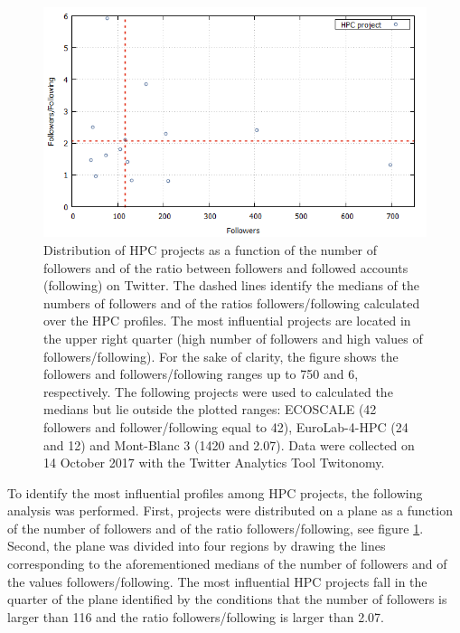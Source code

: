 \begin{figure}[!t] 
 \begin{center}
 \includegraphics[scale=0.45]{Images/HPC_influence.png}
 \caption{Distribution of HPC projects as a function of the number of followers and of the ratio between followers and followed accounts (following) on Twitter. The dashed lines identify the medians of the numbers of followers and of the ratios followers/following calculated over the HPC profiles. The most influential projects are located in the upper right quarter (high number of followers and high values of followers/following). For the sake of clarity, the figure shows the followers and followers/following ranges up to 750 and 6, respectively. The following projects were used to calculated the medians but lie outside the plotted ranges: ECOSCALE (42 followers and follower/following equal to 42), EuroLab-4-HPC (24 and 12) and Mont-Blanc 3 (1420 and 2.07). Data were collected on 14 October 2017 with the Twitter Analytics Tool Twitonomy.}
 \label{HPC_influence_plot}
 \end{center}
\end{figure}

To identify the most influential profiles among HPC projects, the following analysis was performed. First, projects were distributed on a plane as a function of the number of followers and of the ratio followers/following, see figure \ref{HPC_influence_plot}. Second, the plane was divided into four regions by drawing the lines corresponding to the aforementioned medians of the number of followers and of the values followers/following. The most influential HPC projects fall in the quarter of the plane identified by the conditions that the number of followers is larger than 116 and the ratio followers/following is larger than 2.07.

